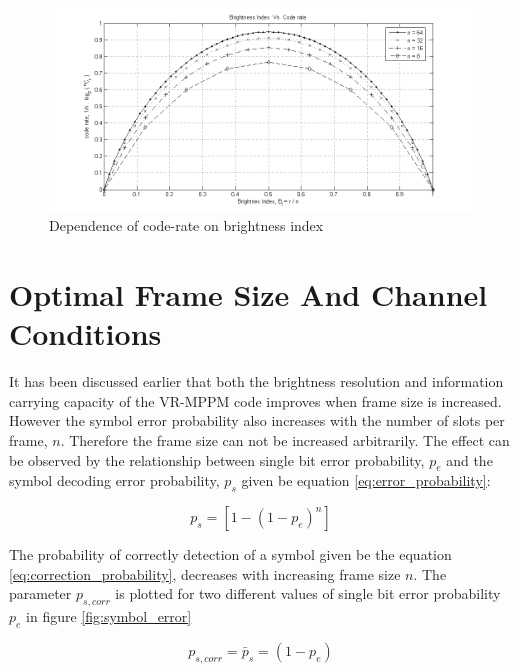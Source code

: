 \begin{figure}[h]
	\centering
	\includegraphics[width=\textwidth]{./Figures/coderate_brightness.png}
	\caption{Dependence of code-rate on brightness index}
	\label{fig:coderate_brightness}
\end{figure}


\section{Optimal Frame Size And Channel Conditions}
 It has been discussed earlier that both the brightness resolution and information carrying capacity of the VR-MPPM code improves when frame size is increased. However the symbol error probability also increases with the number of slots per frame, $n$. Therefore the frame size can not be increased arbitrarily. The effect can be observed by the relationship between single bit error probability, $p_e$ and the symbol decoding error probability, $p_s$ given be equation \ref{eq:error_probability}:

\begin{equation}
p_s=\left[1-(1-p_e)^n \right]
\label{eq:error_probability}
\end{equation}

The probability of correctly detection of a symbol given be the equation \ref{eq:correction_probability}, decreases with increasing frame size $n$. The parameter $p_{s,corr}$ is plotted for two different values of single bit error probability $p_e$ in figure \ref{fig:symbol_error}

\begin{equation}
 p_{s,corr}=\bar{p}_s=(1-p_e)
\label{eq:correction_probability}
\end{equation}

